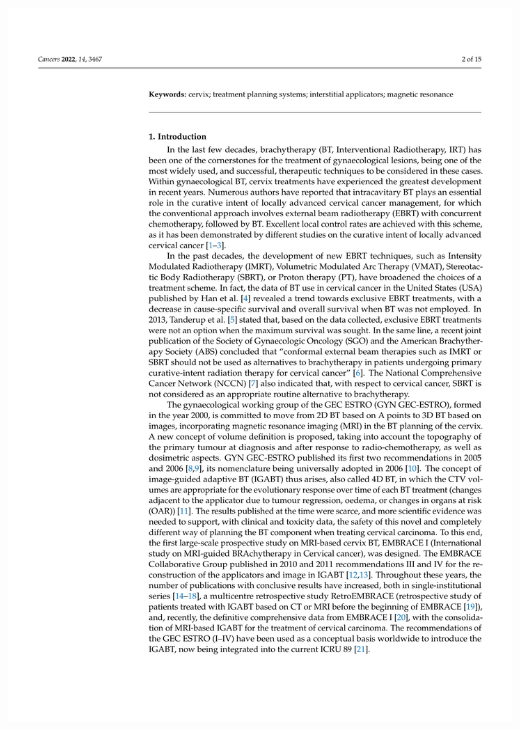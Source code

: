 \documentclass[
  a4paper,
]{scrreprt}
\begin{document}
\includegraphics{articulos/cancers/cancers-02.png}
\end{document}
